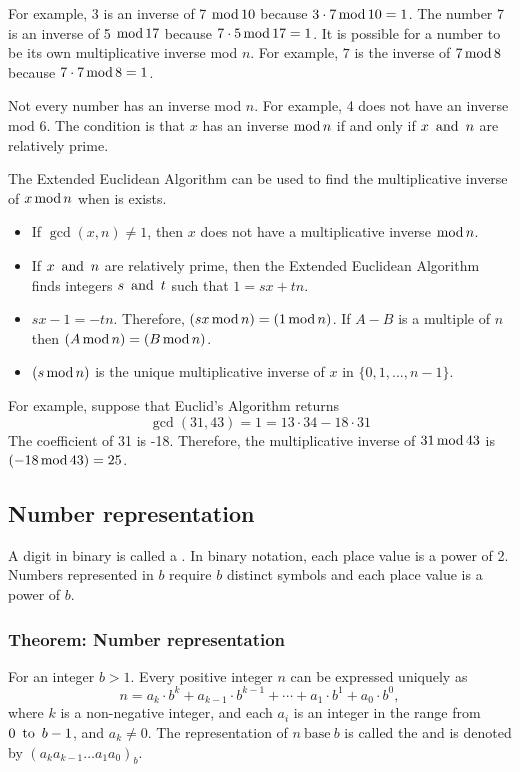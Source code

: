 For example, 3 is an inverse of 7 $\operatorname{\text{mod}} 10$ because $3 \cdot 7 \operatorname{\text{mod}} 10 = 1$. The number 7 is an inverse of 5 $\operatorname{\text{mod}} 17$ because $7 \cdot 5 \operatorname{\text{mod}} 17 = 1$. It is possible for a number to be its own multiplicative inverse mod $n$. For example, $7$ is the inverse of $7 \operatorname{\text{mod}} 8$ because $7 \cdot 7 \operatorname{\text{mod}} 8 = 1$.

Not every number has an inverse mod $n$. For example, 4 does not have an inverse mod $6$. The condition is that $x$ has an inverse $\operatorname{\text{mod}} n$ if and only if $x \operatorname{~\text{and}~} n$ are relatively prime.

The Extended Euclidean Algorithm can be used to find the multiplicative inverse of $x \operatorname{\text{mod}} n$ when is exists.
\begin{itemize}
    \item If $\gcd(x, n) \neq 1$, then $x$ does not have a multiplicative inverse $\operatorname{\text{mod}} n$.
    \item If $x \operatorname{~\text{and}~} n$ are relatively prime, then the Extended Euclidean Algorithm finds integers $s \operatorname{~\text{and}~} t$ such that $1 = sx + tn$.
    \item $sx - 1 = -tn$. Therefore, $(sx \operatorname{\text{mod}} n) = (1 \operatorname{\text{mod}} n)$. If $A - B$ is a multiple of $n$ then $(A \operatorname{\text{mod}} n) = (B \operatorname{\text{mod}} n)$.
    \item $(s \operatorname{\text{mod}} n)$ is the unique multiplicative inverse of $x$ in $\{0, 1, \ldots, n-1\}$.
\end{itemize}
For example, suppose that Euclid's Algorithm returns
\[
    \gcd(31, 43) = 1 = 13 \cdot 34 - 18 \cdot 31
\]
The coefficient of 31 is -18. Therefore, the multiplicative inverse of $31 \operatorname{\text{mod}} 43$ is $(-18 \operatorname{\text{mod}} 43) = 25$.

\subsection{Number representation}
A digit in binary is called a . In binary notation, each place value is a power of 2. Numbers represented in  $b$ require $b$ distinct symbols and each place value is a power of $b$.

\subsubsection*{Theorem: Number representation}
For an integer $b>1$. Every positive integer $n$ can be expressed uniquely as
\[
    n = a_k \cdot b^k + a_{k-1} \cdot b^{k-1} + \cdots + a_1 \cdot b^1 + a_0 \cdot b^0,
\]
where $k$ is a non-negative integer, and each $a_i$ is an integer in the range from $0 \operatorname{~\text{to}~} b-1$, and $a_k \neq 0$.
The representation of $n~\text{base}~b$ is called the  and is denoted by $(a_ka_{k-1}\ldots a_1a_0)_b$.

